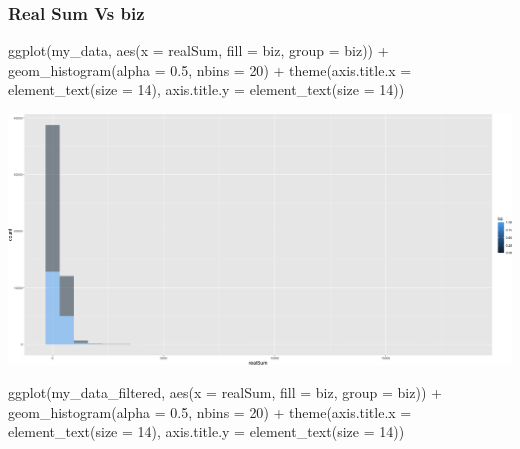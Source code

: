 \documentclass[
]{article}
\newenvironment{Shaded}{\begin{snugshade}}{\end{snugshade}}
\newcommand{\AttributeTok}[1]{\textcolor[rgb]{0.77,0.63,0.00}{#1}}
\newcommand{\DecValTok}[1]{\textcolor[rgb]{0.00,0.00,0.81}{#1}}
\newcommand{\FloatTok}[1]{\textcolor[rgb]{0.00,0.00,0.81}{#1}}
\newcommand{\FunctionTok}[1]{\textcolor[rgb]{0.00,0.00,0.00}{#1}}
\newcommand{\NormalTok}[1]{#1}
\newcommand{\SpecialCharTok}[1]{\textcolor[rgb]{0.00,0.00,0.00}{#1}}
\begin{document}
\hypertarget{real-sum-vs-biz}{%
\subsubsection{Real Sum Vs biz}\label{real-sum-vs-biz}}

\begin{Shaded}
\begin{Highlighting}[]
\FunctionTok{ggplot}\NormalTok{(my\_data, }\FunctionTok{aes}\NormalTok{(}\AttributeTok{x =}\NormalTok{ realSum, }\AttributeTok{fill =}\NormalTok{ biz, }\AttributeTok{group =}\NormalTok{ biz)) }\SpecialCharTok{+}
    \FunctionTok{geom\_histogram}\NormalTok{(}\AttributeTok{alpha =} \FloatTok{0.5}\NormalTok{, }\AttributeTok{nbins =} \DecValTok{20}\NormalTok{) }\SpecialCharTok{+} \FunctionTok{theme}\NormalTok{(}\AttributeTok{axis.title.x =} \FunctionTok{element\_text}\NormalTok{(}\AttributeTok{size =} \DecValTok{14}\NormalTok{),}
    \AttributeTok{axis.title.y =} \FunctionTok{element\_text}\NormalTok{(}\AttributeTok{size =} \DecValTok{14}\NormalTok{))}
\end{Highlighting}
\end{Shaded}

\includegraphics{Project_files/figure-latex/unnamed-chunk-22-1.png}

\begin{Shaded}
\begin{Highlighting}[]
\FunctionTok{ggplot}\NormalTok{(my\_data\_filtered, }\FunctionTok{aes}\NormalTok{(}\AttributeTok{x =}\NormalTok{ realSum, }\AttributeTok{fill =}\NormalTok{ biz, }\AttributeTok{group =}\NormalTok{ biz)) }\SpecialCharTok{+}
    \FunctionTok{geom\_histogram}\NormalTok{(}\AttributeTok{alpha =} \FloatTok{0.5}\NormalTok{, }\AttributeTok{nbins =} \DecValTok{20}\NormalTok{) }\SpecialCharTok{+} \FunctionTok{theme}\NormalTok{(}\AttributeTok{axis.title.x =} \FunctionTok{element\_text}\NormalTok{(}\AttributeTok{size =} \DecValTok{14}\NormalTok{),}
    \AttributeTok{axis.title.y =} \FunctionTok{element\_text}\NormalTok{(}\AttributeTok{size =} \DecValTok{14}\NormalTok{))}
\end{Highlighting}
\end{Shaded}
\end{document}
